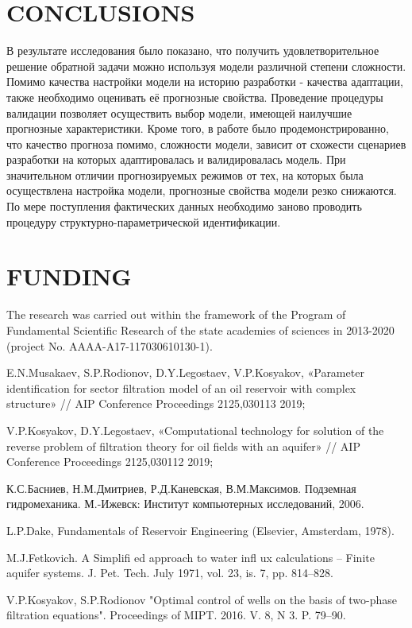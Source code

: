 \documentclass{article}
\begin{document}
\section{CONCLUSIONS}

В результате исследования было показано, что получить удовлетворительное решение обратной задачи можно используя модели различной степени сложности. Помимо качества настройки модели на историю разработки - качества адаптации, также необходимо оценивать её прогнозные свойства. Проведение процедуры валидации позволяет осуществить выбор модели, имеющей наилучшие прогнозные характеристики. Кроме того, в работе было продемонстрированно, что качество прогноза помимо, сложности модели, зависит от схожести сценариев разработки на которых адаптировалась и валидировалась модель. При  значительном отличии прогнозируемых режимов от тех, на которых была осуществлена настройка модели, прогнозные свойства модели резко снижаются. По мере поступления фактических данных необходимо заново проводить процедуру структурно-параметрической идентификации.

\section{FUNDING}
The research was carried out within the framework of the Program of Fundamental Scientific Research of the state academies of sciences in 2013-2020 (project No. AAAA-A17-117030610130-1).

%
%
\begin{thebibliography}{99}
 E.N.Musakaev, S.P.Rodionov, D.Y.Legostaev, V.P.Kosyakov,  «Parameter identification for sector filtration model of an oil reservoir with complex structure» // AIP Conference Proceedings 2125,030113 2019;

 V.P.Kosyakov, D.Y.Legostaev,  «Computational technology for solution of the reverse problem of filtration theory for oil fields with an aquifer» // AIP Conference Proceedings 2125,030112 2019;

 К.С.Басниев, Н.М.Дмитриев, Р.Д.Каневская, В.М.Максимов. Подземная гидромеханика.  М.-Ижевск: Институт компьютерных исследований, 2006. 

 L.P.Dake, Fundamentals of Reservoir Engineering (Elsevier, Amsterdam, 1978).

 M.J.Fetkovich. A Simplifi ed approach to water infl ux calculations – Finite aquifer systems. J. Pet. Tech. July 1971, vol. 23, is. 7, pp. 814–828.

 V.P.Kosyakov, S.P.Rodionov "Optimal control of wells on the basis of two-phase filtration equations". Proceedings of MIPT. 2016. V. 8, N 3. P. 79–90.


\end{thebibliography}
\end{document}
